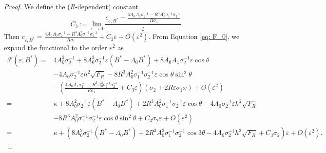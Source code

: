 \documentclass[12pt,reqno]{amsart}
\numberwithin{equation}{section}
\theoremstyle{definition}
\theoremstyle{remark}
\begin{document}
\begin{proof}
  
We define the ($R$-dependent) constant
\begin{equation}\label{eq:C3-def}
C_3:=\lim_{\varepsilon\to0}\frac{c_{\varepsilon,B^*}-
	\frac{4A_0A_1\sigma_2^{-1}-R^3A_0^2\sigma_1^{-1}\sigma_2^{-1}}{R\sigma_1}}{\varepsilon}.
\end{equation}
Then $ c_{\varepsilon,B^*}=	\frac{4A_0A_1\sigma_2^{-1}-R^3A_0^2\sigma_1^{-1}\sigma_2^{-1}}{R\sigma_1}+C_3\varepsilon+O(\varepsilon^2) $. From Equation \eqref{eq: F_0}, we expand the functional to the order $ \varepsilon^2 $ as
\begin{equation}\label{eq:Fboundary-6A3}
\begin{split}
\mathcal F(\varepsilon,B^*)={}&4 A_0^2\sigma_2^{-1}+ 8 A_0^2 \sigma_2^{-1} \varepsilon(B^*-\Lambda_0B^*)+ 8 A_0A_1 \sigma_2^{-1} \varepsilon \cos\theta    \\
& -4 A_0 \sigma_2^{-1} \varepsilon h^2\sqrt{F_R}-8 R^3 A_0^2  \sigma_1^{-1} \sigma_2^{-1} \varepsilon\cos\theta\sin^2\theta\\
&-\left( \frac{4A_0A_1\sigma_2^{-1}-R^3A_0^2\sigma_1^{-1}\sigma_2^{-1}}{R\sigma_1}+C_3\varepsilon \right)\left( \sigma_2+2R\varepsilon\sigma_1x \right)+O\left(\varepsilon^2\right)  \\
={}&\kappa+ 8 A_0^2 \sigma_2^{-1} \varepsilon(B^*-\Lambda_0B^*)+2R^3A_0^2\sigma_1^{-1}\sigma_2^{-1}\varepsilon \cos\theta-4A_0\sigma_2^{-1}\varepsilon h^2\sqrt{F_R}\\
&-8R^3A_0^2\sigma_1^{-1}\sigma_2^{-1}\varepsilon \cos\theta\sin^2\theta
+C_3\sigma_2\varepsilon+O(\varepsilon^2)\\
=&\kappa+ \left( 8 A_0^2 \sigma_2^{-1}  (B^*-\Lambda_0B^*)+2R^3A_0^2\sigma_1^{-1}\sigma_2^{-1} \cos3\theta -4A_0\sigma_2^{-1}  h^2\sqrt{F_R} 
+C_3\sigma_2\right) \varepsilon+O(\varepsilon^2).
\end{split}
\end{equation}
 

\end{proof}
\end{document}
